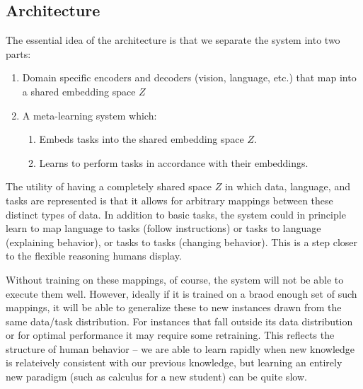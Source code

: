 \documentclass[11pt]{article}
\begin{document}
\subsection{Architecture}
The essential idea of the architecture is that we separate the system into two parts: 
\begin{enumerate}
\item Domain specific encoders and decoders (vision, language, etc.) that map into a shared embedding space $Z$
\item A meta-learning system which:
    \begin{enumerate}
    \item Embeds tasks into the shared embedding space $Z$.
    \item Learns to perform tasks in accordance with their embeddings.
    \end{enumerate}
\end{enumerate}
The utility of having a completely shared space $Z$ in which data, language, and tasks are represented is that it allows for arbitrary mappings between these distinct types of data. In addition to basic tasks, the system could in principle learn to map language to tasks (follow instructions) or tasks to language (explaining behavior), or tasks to tasks (changing behavior). This is a step closer to the flexible reasoning humans display. \par
Without training on these mappings, of course, the system will not be able to execute them well. However, ideally if it is trained on a braod enough set of such mappings, it will be able to generalize these to new instances drawn from the same data/task distribution. For instances that fall outside its data distribution or for optimal performance it may require some retraining. This reflects the structure of human behavior -- we are able to learn rapidly when new knowledge is relateively consistent with our previous knowledge, but learning an entirely new paradigm (such as calculus for a new student) can be quite slow. \par 
\end{document}
